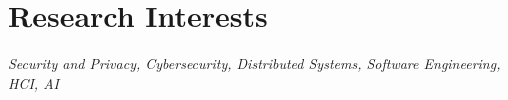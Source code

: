 \section{\textbf{Research Interests}}

\textit{Security and Privacy, Cybersecurity, Distributed Systems, Software Engineering, HCI, AI}


